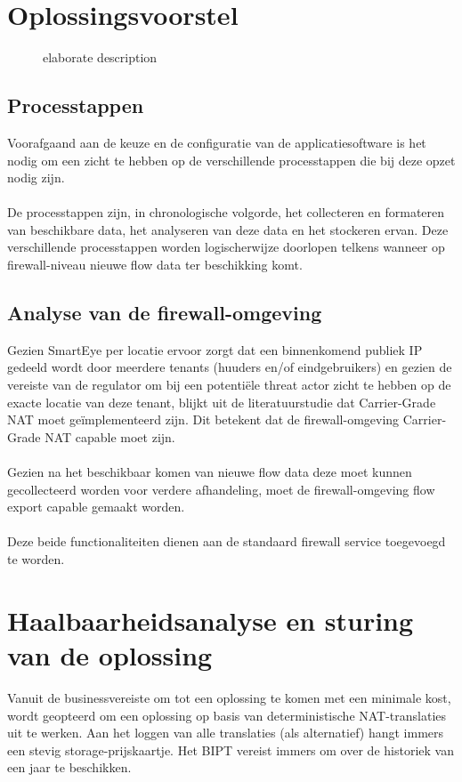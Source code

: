 \section{Oplossingsvoorstel}

\begin{figure}[!htbp]
    
    \caption[short description]{elaborate description}
    \label{fig:Oplossingsvoorstel}
\end{figure}

\subsection{Processtappen}
Voorafgaand aan de keuze en de configuratie van de applicatiesoftware is het nodig om een zicht te hebben op de verschillende processtappen die bij deze opzet nodig zijn.

\paragraph{}
De processtappen zijn, in chronologische volgorde, het collecteren en formateren van beschikbare data, het analyseren van deze data en het stockeren ervan. Deze verschillende processtappen worden logischerwijze doorlopen telkens wanneer op firewall-niveau nieuwe flow data ter beschikking komt.

\subsection{Analyse van de firewall-omgeving}
Gezien SmartEye per locatie ervoor zorgt dat een binnenkomend publiek IP gedeeld wordt door meerdere tenants (huuders en/of eindgebruikers) en gezien de vereiste van de regulator om bij een potentiële threat actor zicht te hebben op de exacte locatie van deze tenant, blijkt uit de literatuurstudie dat Carrier-Grade NAT moet geïmplementeerd zijn. Dit betekent dat de firewall-omgeving Carrier-Grade NAT capable moet zijn.

\paragraph{}
Gezien na het beschikbaar komen van nieuwe flow data deze moet kunnen gecollecteerd worden voor verdere afhandeling, moet de firewall-omgeving flow export capable gemaakt worden.

\paragraph{}
Deze beide functionaliteiten dienen aan de standaard firewall service toegevoegd te worden.

\section{Haalbaarheidsanalyse en sturing van de oplossing}
Vanuit de businessvereiste om tot een oplossing te komen met een minimale kost, wordt geopteerd om een oplossing op basis van deterministische NAT-translaties uit te werken. Aan het loggen van alle translaties (als alternatief) hangt immers een stevig storage-prijskaartje. Het BIPT vereist immers om over de historiek van een jaar te beschikken.

